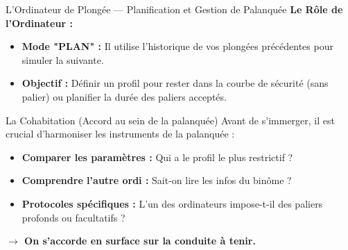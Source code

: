 \begin{frame}{L'Ordinateur de Plongée — Planification et Gestion de Palanquée}
    \textbf{Le Rôle de l'Ordinateur :}
    \begin{itemize}
        \item \textbf{Mode "PLAN" :} Il utilise l'historique de vos plongées précédentes pour simuler la suivante.
        \item \textbf{Objectif :} Définir un profil pour rester dans la courbe de sécurité (sans palier) ou planifier la durée des paliers acceptés.
    \end{itemize}

    \vspace{0.3cm}

    \begin{block}{La Cohabitation (Accord au sein de la palanquée)}
        Avant de s'immerger, il est crucial d'harmoniser les instruments de la palanquée :
        \begin{itemize}
            \item \textbf{Comparer les paramètres :} Qui a le profil le plus restrictif ?
            \item \textbf{Comprendre l'autre ordi :} Sait-on lire les infos du binôme ?
            \item \textbf{Protocoles spécifiques :} L'un des ordinateurs impose-t-il des paliers profonds ou facultatifs ?
        \end{itemize}
        \textbf{$\rightarrow$ On s'accorde en surface sur la conduite à tenir.}
    \end{block}
\end{frame}

